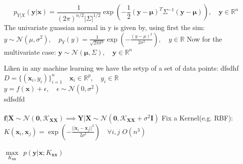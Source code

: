 \documentclass[12pt]{article}
\begin{document}
\[
p_{Y|X}(\mathbf{y}| \mathbf{x}) = \frac{1}{(2\pi)^{n/2} |\Sigma|^{1/2}} \exp\left(-\frac{1}{2}(\mathbf{y} - \boldsymbol{\mu})^T \Sigma^{-1} (\mathbf{y} - \boldsymbol{\mu})\right) , \quad \mathbf{y} \in \mathbb{R}^n
\]
The univariate guassian normal in y is given by, using first the sim: 
\newpage
$y \sim \mathcal{N}(\mu, \sigma^2), \quad p_{Y}(y) = \frac{1}{\sqrt{2\pi \sigma^2}} \exp\left(-\frac{(y - \mu)^2}{2\sigma^2}\right) , \quad y \in \mathbb{R}$
\newpage
Now for the multivariate case: \newpage
$\mathbf{y} \sim \mathcal{N}(\boldsymbol{\mu}, \Sigma) ,  \quad \mathbf{y} \in \mathbb{R}^n$

\newpage
Liken in any machine learning we have the setyp of a set of data points: 
\newpage
dfsdhf\\
$D = \{(\mathbf{x}_i, y_i)\}_{i=1}^n \quad \mathbf{x}_i \in \mathbb{R}^p , \quad y_i \in \mathbb{R}$\\
$y = f(\mathbf{x}) + \epsilon, \quad \epsilon \sim \mathcal{N}(0, \sigma^2)$\\

\newpage
sdfsdfd\\\\
$\mathbf{f}|\mathbf{X} \sim \mathcal{N}(\textbf{0}, \mathcal{K}_{\mathbf{X}\mathbf{X}}) \implies  \mathbf{Y}|\mathbf{X} \sim \mathcal{N}(\mathbf{0},   \mathcal{K}_{\mathbf{X}\mathbf{X}} +\sigma^2\mathbf{I}) $ \newpage
Fix a Kernel(e.g. RBF):  $ K(\mathbf{x}_i, \mathbf{x}_j) = \exp\left(-\frac{||\mathbf{x}_i - \mathbf{x}_j||^2}{2\rho^2}\right) \quad \forall i,j$ \newpage
$O(n^3)$ \newpage

$\max\limits_{K_{\mathbf{x}\mathbf{x}}} \ \  p(\textbf{y}|\mathbf{x}; K_{\mathbf{x}\mathbf{x}})$ 
\newpage
\end{document}
